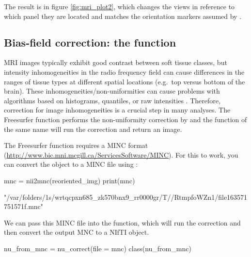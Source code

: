 The result is in figure \ref{fig:mri_plot2}, which changes the views in
reference to which panel they are located and matches the orientation
markers assumed by .

\subsection{\texorpdfstring{Bias-field correction: the
function}{Bias-field correction: the  function}}\label{bias-field-correction-the-function}

MRI images typically exhibit good contrast between soft tissue classes,
but intensity inhomogeneities in the radio frequency field can cause
differences in the ranges of tissue types at different spatial locations
(e.g.~top versus bottom of the brain). These
inhomogeneities/non-uniformities can cause problems with algorithms
based on histograms, quantiles, or raw intensities
\citep{zhang_segmentation_2001}. Therefore, correction for image
inhomogeneities is a crucial step in many analyses. The Freesurfer
function  performs the non-uniformity correction by
\citet{sled_nonparametric_1998} and the  function of the
same name will run the correction and return an image.

The Freesurfer  function requires a MINC format
(\url{http://www.bic.mni.mcgill.ca/ServicesSoftware/MINC}). For this to
work, you can convert the  object to a MINC file using
:

\begin{Schunk}
\begin{Sinput}
mnc = nii2mnc(reoriented_img)
print(mnc)
\end{Sinput}
\begin{Soutput}
[1] "/var/folders/1s/wrtqcpxn685_zk570bnx9_rr0000gr/T//RtmpfoWZn1/file163571751571f.mnc"
\end{Soutput}
\end{Schunk}

We can pass this MINC file into the  
function, which will run the correction and then convert the output MNC
to a NIfTI object.

\begin{Schunk}
\begin{Sinput}
nu_from_mnc = nu_correct(file = mnc)
class(nu_from_mnc)
\end{Sinput}
\end{Schunk}


